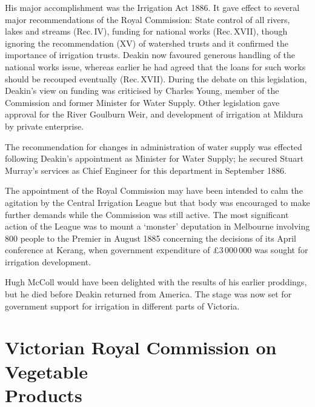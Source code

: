 His major accomplishment was the Irrigation Act
 1886. It gave effect to
several major recommendations of the Royal Commission: State control
of all rivers, lakes and streams (Rec.\,IV), funding for national
works (Rec.\,XVII), though ignoring the recommendation (XV) of
watershed trusts and it confirmed the importance of irrigation trusts.
Deakin now favoured generous handling of the national works issue,
whereas earlier he had agreed that the loans for such works should be
recouped eventually (Rec.\,XVII).  During the debate on this
legislation, Deakin's view on funding was criticised by Charles Young,
 member of the Commission and former Minister for
Water Supply.  Other legislation gave approval for the River Goulburn
Weir, and development of irrigation at Mildura 
by private enterprise.

The recommendation for changes in administration of water supply was
effected following Deakin's appointment as Minister for Water Supply;
he secured Stuart Murray's  services as Chief
Engineer for this department in September 1886.

The appointment of the Royal Commission may have been intended to calm
the agitation by the Central Irrigation League
 but that body was
encouraged to make further demands while the Commission was still
active.  The most significant action of the League was to mount a
`monster' deputation in Melbourne involving 800 people to the Premier
in August 1885 concerning the decisions of its April conference at
Kerang,  when government expenditure of
\pounds3\,000\,000 was sought for irrigation
development.

Hugh McColl would have been delighted with the results of his earlier
proddings, but he died before Deakin returned from
America.  The stage was now set for government support
for irrigation in different parts of Victoria.

\section*{Victorian Royal Commission on Vegetable\\
 Products}

